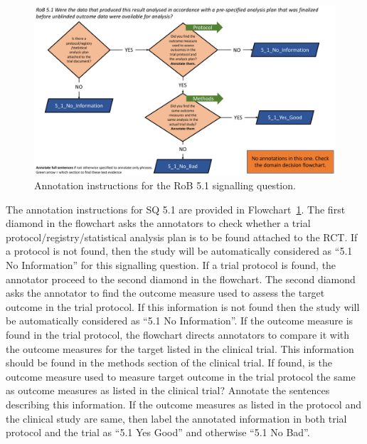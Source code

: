 \documentclass[sn-mathphys,Numbered]{sn-jnl}%
\begin{document}
%
%
%
\begin{figure}[htbp]
    \centering
    \includegraphics[width=\textwidth]{figures/5_1.pdf}
    \caption{Annotation instructions for the RoB 5.1 signalling question.}
    \label{fig:5_1}
\end{figure}
%
%
%


The annotation instructions for SQ 5.1 are provided in Flowchart~\ref{fig:5_1}.
The first diamond in the flowchart asks the annotators to check whether a trial protocol/registry/statistical analysis plan is to be found attached to the RCT.
If a protocol is not found, then the study will be automatically considered as ``5.1 No Information'' for this signalling question.
If a trial protocol is found, the annotator proceed to the second diamond in the flowchart.
The second diamond asks the annotator to find the outcome measure used to assess the target outcome in the trial protocol.
If this information is not found then the study will be automatically considered as ``5.1 No Information''.
If the outcome measure is found in the trial protocol, the flowchart directs annotators to compare it with the outcome measures for the target listed in the clinical trial.
This information should be found in the methods section of the clinical trial.
If found, is the outcome measure used to measure target outcome in the trial protocol the same as outcome measures as listed in the clinical trial?
Annotate the sentences describing this information. 
If the outcome measures as listed in the protocol and the clinical study are same, then label the annotated information in both trial protocol and the trial as ``5.1 Yes Good'' and otherwise ``5.1 No Bad''.

%
%
%
\end{document}
